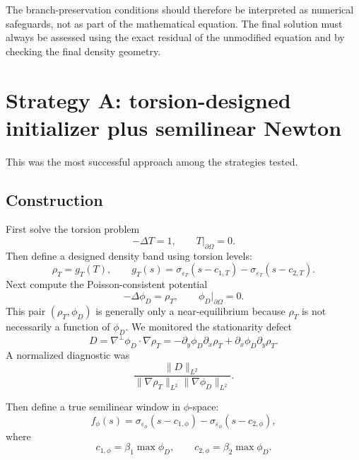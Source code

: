 \documentclass[11pt,a4paper]{article}
\newcommand{\Om}{\Omega}
\newcommand{\eps}{\varepsilon}
\begin{document}
The branch-preservation conditions should therefore be interpreted as numerical
safeguards, not as part of the mathematical equation. The final solution must
always be assessed using the exact residual of the unmodified equation and by
checking the final density geometry.

\section{Strategy A: torsion-designed initializer plus semilinear Newton}

This was the most successful approach among the strategies tested.

\subsection{Construction}

First solve the torsion problem
\begin{equation}
  -\Delta T=1,
  \qquad T|_{\partial\Om}=0.
\end{equation}
Then define a designed density band using torsion levels:
\begin{equation}
  \rho_T=g_T(T),
  \qquad
  g_T(s)=\sigma_{\eps_T}(s-c_{1,T})-
  \sigma_{\eps_T}(s-c_{2,T}).
\end{equation}
Next compute the Poisson-consistent potential
\begin{equation}
  -\Delta\phi_D=\rho_T,
  \qquad \phi_D|_{\partial\Om}=0.
\end{equation}
This pair $(\rho_T,\phi_D)$ is generally only a near-equilibrium because $\rho_T$ is not necessarily a function of $\phi_D$. We monitored the stationarity defect
\begin{equation}
  D=\nabla^\perp\phi_D\cdot\nabla\rho_T
  =-\partial_y\phi_D\partial_x\rho_T+
  \partial_x\phi_D\partial_y\rho_T.
\end{equation}
A normalized diagnostic was
\begin{equation}
  \frac{\|D\|_{L^2}}{\|\nabla\rho_T\|_{L^2}\|\nabla\phi_D\|_{L^2}}.
\end{equation}

Then define a true semilinear window in $\phi$-space:
\begin{equation}
  f_\phi(s)=\sigma_{\eps_\phi}(s-c_{1,\phi})-
  \sigma_{\eps_\phi}(s-c_{2,\phi}),
\end{equation}
where
\begin{equation}
  c_{1,\phi}=\beta_1\max\phi_D,
  \qquad
  c_{2,\phi}=\beta_2\max\phi_D.
\end{equation}
\end{document}
